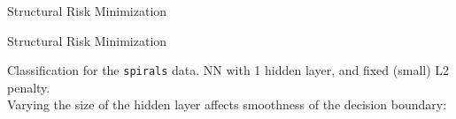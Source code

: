 \documentclass[11pt,compress,t,notes=noshow, xcolor=table]{beamer}
\begin{document}
\begin{vbframe} {Structural Risk Minimization}
\end{vbframe}

\begin{frame} {Structural Risk Minimization}

\small

Classification for the \texttt{spirals} data.
NN with 1 hidden layer, and fixed (small) L2 penalty. \\
Varying the size of the hidden layer affects smoothness of the decision boundary:


\vfill


\end{frame}
\end{document}
